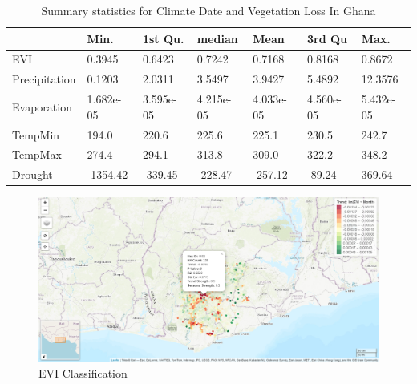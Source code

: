 \begin{table}[]
	\label{table:Summary Statistics}
	\caption{Summary statistics for Climate Date and Vegetation Loss In Ghana}
	\centering
	
	\begin{tabularx}{\textwidth}{|l*{3}{X|}*{3}{X|}}
		\toprule
		                   & Min.      & 1st Qu. & median   & Mean     & 3rd Qu   & Max.  \\ \midrule
		EVI                &   0.3945  & 0.6423  & 0.7242   & 0.7168   & 0.8168   &0.8672 \\
		Precipitation      &   0.1203  & 2.0311  & 3.5497   &  3.9427  & 5.4892   &12.3576 \\
		Evaporation        & 1.682e-05 &3.595e-05&4.215e-05 &4.033e-05 & 4.560e-05&5.432e-05 \\
		TempMin            &   194.0   & 220.6   & 225.6    & 225.1    & 230.5    &242.7 \\
		TempMax            &   274.4   & 294.1   & 313.8    & 309.0    &  322.2   &348.2 \\ 
		Drought            &  -1354.42 & -339.45 & -228.47  &-257.12   & -89.24   &369.64 \\ \bottomrule
	\end{tabularx}
\end{table}
\begin{figure}
	\centering
	\includegraphics[width=0.9\linewidth]{images/Map}
	\caption{EVI Classification}
	\label{fig:map}
\end{figure}


